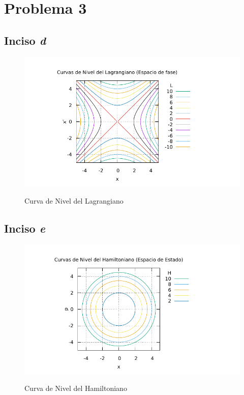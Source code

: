 \section{Problema 3}
\subsection{Inciso \textit{d}}

\begin{figure}[H]
	\centering
	\includegraphics[scale=1.05]{problema3d.pdf}
	\label{2d}
	\caption{Curva de Nivel del Lagrangiano}
\end{figure}



\subsection{Inciso \textit{e}}

\begin{figure}[H]
	\centering
	\includegraphics[scale=1.05]{problema3e.pdf}
	\label{2d}
	\caption{Curva de Nivel del Hamiltoniano}
\end{figure}







